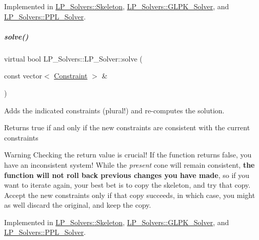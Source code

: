Implemented in \hyperlink{group___c_l_s_solvers_a3b0e821ab6a683ab4f936b7552074a15}{L\+P\+\_\+\+Solvers\+::\+Skeleton}, \hyperlink{group___c_l_s_solvers_aadfa4655b194b3b095db962c5900fee6}{L\+P\+\_\+\+Solvers\+::\+G\+L\+P\+K\+\_\+\+Solver}, and \hyperlink{group___c_l_s_solvers_a9a4a7563d62e4394162aaa4bd08aae29}{L\+P\+\_\+\+Solvers\+::\+P\+P\+L\+\_\+\+Solver}.

\mbox{\label{group___c_l_s_solvers_aea1a5bf98a2c4c06b0550cacdf8b88fd}} 
\subparagraph{\texorpdfstring{solve()}{solve()}\hspace{0.1cm}{\footnotesize\ttfamily [2/2]}}
{\footnotesize\ttfamily virtual bool L\+P\+\_\+\+Solvers\+::\+L\+P\+\_\+\+Solver\+::solve (\begin{DoxyParamCaption}\item[{const vector$<$ \hyperlink{group___c_l_s_solvers_class_l_p___solvers_1_1_constraint}{Constraint} $>$ \&}]{ }\end{DoxyParamCaption})\hspace{0.3cm}{\ttfamily [pure virtual]}}



Adds the indicated constraints (plural!) and re-\/computes the solution. 

\begin{DoxyReturn}{Returns}
{\ttfamily true} if and only if the new constraints are consistent with the current constraints
\end{DoxyReturn}
\begin{DoxyWarning}{Warning}
Checking the return value is crucial! If the function returns {\ttfamily false}, you have an inconsistent system! While the {\itshape present} cone will remain consistent, {\bfseries the function will not roll back previous changes you have made}, so if you want to iterate again, your best bet is to copy the skeleton, and try that copy. Accept the new constraints only if that copy succeeds, in which case, you might as well discard the original, and keep the copy. 
\end{DoxyWarning}


Implemented in \hyperlink{group___c_l_s_solvers_adf50f125e2bfc6834fdd93e3fff22c48}{L\+P\+\_\+\+Solvers\+::\+Skeleton}, \hyperlink{group___c_l_s_solvers_a08fcdf86d0fcd8ac3e5da077b627e477}{L\+P\+\_\+\+Solvers\+::\+G\+L\+P\+K\+\_\+\+Solver}, and \hyperlink{group___c_l_s_solvers_a3763d4bc551a98546f1f5be4df49390d}{L\+P\+\_\+\+Solvers\+::\+P\+P\+L\+\_\+\+Solver}.



